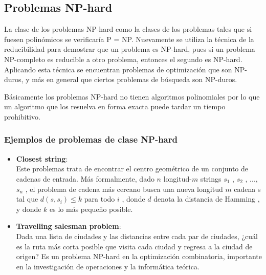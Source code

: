 \subsection{Problemas NP-hard}
La clase de los problemas NP-hard como la clases de los problemas tales que si fuesen polinómicos se verificaría P = NP. Nuevamente se utiliza la técnica de la reducibilidad para demostrar que un problema es NP-hard, pues si un problema NP-completo es reducible a otro problema, entonces el segundo es NP-hard. Aplicando esta técnica se encuentran problemas de optimización que son NP-duros, y más en general que ciertos problemas de búsqueda son NP-duros.

Básicamente los problemas NP-hard no tienen algoritmos polinomiales por lo que un algoritmo que los resuelva en forma exacta puede tardar un tiempo prohibitivo. 

\subsubsection{Ejemplos de problemas de clase NP-hard}
\begin{itemize}
    \item \textbf{Closest string}:\\
    Este problemas trata de encontrar el centro geométrico de un conjunto de cadenas de entrada. Más formalmente, dado $n$ longitud-$m$ strings $s_1$ , $s_2$ , ..., $s_n$ , el problema de cadena más cercano busca una nueva longitud $m$ cadena s tal que $d ( s , s_i ) \leq k$ para todo $i$ , donde $d$ denota la distancia de Hamming , y donde $k$ es lo más pequeño posible.
    \item \textbf{Travelling salesman problem}:\\
    Dada una lista de ciudades y las distancias entre cada par de ciudades, ¿cuál es la ruta más corta posible que visita cada ciudad y regresa a la ciudad de origen? Es un problema NP-hard en la optimización combinatoria, importante en la investigación de operaciones y la informática teórica.
\end{itemize}

